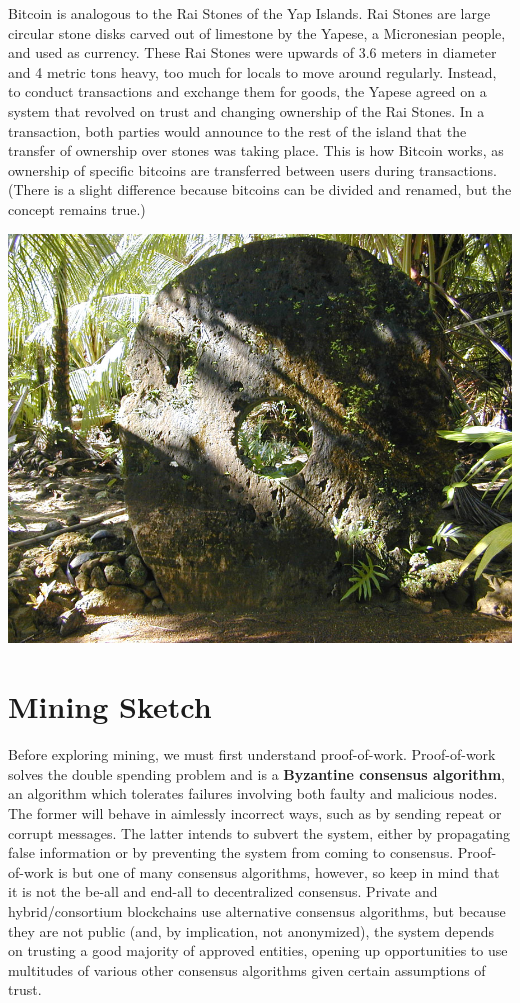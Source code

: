 \documentclass[11pt]{article}
\begin{document}
    Bitcoin is analogous to the Rai Stones of the Yap Islands. Rai Stones are large circular stone disks carved out of limestone by the Yapese, a Micronesian people, and used as currency. These Rai Stones were upwards of 3.6 meters in diameter and 4 metric tons heavy, too much for locals to move around regularly. Instead, to conduct transactions and exchange them for goods, the Yapese agreed on a system that revolved on trust and changing ownership of the Rai Stones. In a transaction, both parties would announce to the rest of the island that the transfer of ownership over stones was taking place. This is how Bitcoin works, as ownership of specific bitcoins are transferred between users during transactions. (There is a slight difference because bitcoins can be divided and renamed, but the concept remains true.)
    
    \begin{center}
    \includegraphics[scale=0.7]{rai}
    \end{center}
    
    \section*{Mining Sketch}
    
    Before exploring mining, we must first understand proof-of-work. Proof-of-work solves the double spending problem and is a \textbf{Byzantine consensus algorithm}, an algorithm which tolerates failures involving both faulty and malicious nodes. The former will behave in aimlessly incorrect ways, such as by sending repeat or corrupt messages. The latter intends to subvert the system, either by propagating false information or by preventing the system from coming to consensus. Proof-of-work is but one of many consensus algorithms, however, so keep in mind that it is not the be-all and end-all to decentralized consensus. Private and hybrid/consortium blockchains use alternative consensus algorithms, but because they are not public (and, by implication, not anonymized), the system depends on trusting a good majority of approved entities, opening up opportunities to use multitudes of various other consensus algorithms given certain assumptions of trust.
    
\end{document}

